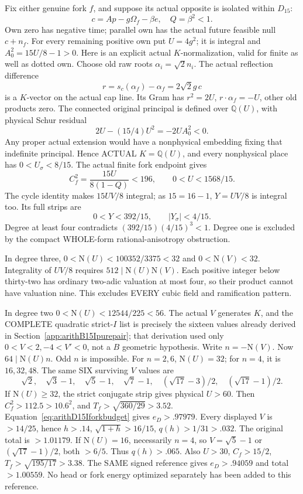 \documentclass[11pt]{article}
\begin{document}
Fix either genuine fork \(f\), and suppose its actual
opposite is isolated within \(D_{15}\):
\[
                  c=Ap-g\Omega_f-\beta e,\quad Q=\beta^2<1.
\]
Own zero has negative time; parallel own has
the actual future feasible null \(c+n_f\).
For every remaining positive own put \(U=4g^2\);
it is integral and
\(A_0^2=15U/8-1>0\).
Here is an explicit actual \(K\)-normalization,
valid for finite as well as dotted own.
Choose old raw roots \(\alpha_i=\sqrt2n_i\).
The actual reflection difference
\[
                       r=s_c(\alpha_f)-\alpha_f=2\sqrt2g\,c
\]
is a \(K\)-vector on the actual cap line.
Its Gram has
\(r^2=2U\), \(r\cdot\alpha_f=-U\), other old products zero.
The connected original principal is defined over
\(\mathbb Q(U)\), with physical Schur residual
\[
                     2U-(15/4)U^2=-2UA_0^2<0.
\]
Any proper actual extension would have a nonphysical
embedding fixing that indefinite principal.
Hence ACTUAL \(K=\mathbb Q(U)\), and every nonphysical
place has \(0<U_\sigma<8/15\).
The actual finite fork endpoint gives
\[
              C_f^2={\frac{15U}{8(1-Q)}}<196,\qquad
              0<U<1568/15 .
\]
The cycle identity makes \(15UV/8\) integral;
as \(15=16-1\), \(Y=UV/8\) is integral too.
Its full strips are
\[
                 0<Y<392/15,\qquad |Y_\sigma|<4/15.
\]
Degree at least four contradicts
\((392/15)(4/15)^3<1\).
Degree one is excluded by the compact WHOLE-form
rational-anisotropy obstruction.

In degree three,
\(0<\mathrm N(U)<100352/3375<32\) and
\(0<\mathrm N(V)<32\).
Integrality of \(UV/8\) requires
\(512\mid\mathrm N(U)\mathrm N(V)\).
Each positive integer below thirty-two has ordinary
two-adic valuation at most four, so their product
cannot have valuation nine.
This excludes EVERY cubic field and ramification pattern.

In degree two \(0<\mathrm N(U)<12544/225<56\).
The actual \(V\) generates \(K\), and the COMPLETE
quadratic strict-\(I\) list is precisely the sixteen
values already derived in
Section~\ref{app:arithB15Ipurepair};
that derivation used only \(0<V<2,-4<V'<0\),
not a \(B\) geometric hypothesis.
Write \(n=-\mathrm N(V)\).
Now \(64\mid\mathrm N(U)n\).
Odd \(n\) is impossible.
For \(n=2,6\), \(\mathrm N(U)=32\);
for \(n=4\), it is \(16,32,48\).
The same SIX surviving \(V\) values are
\[
 \sqrt2,\quad\sqrt3-1,\quad\sqrt5-1,\quad\sqrt7-1,\quad
 (\sqrt{17}-3)/2,\quad(\sqrt{17}-1)/2.
\]
If \(\mathrm N(U)\ge32\), the strict conjugate strip
gives physical \(U>60\).
Then \(C_f^2>112.5>10.6^2\), and
\(T_f>\sqrt{360/29}>3.52\).
Equation~\eqref{eq:arithD15Iforkbudget} gives
\(e_D>.97979\).
Every displayed \(V\) is \(>14/25\), hence \(h>.14\),
\(\sqrt{1+h}>16/15\), \(q(h)>1/31>.032\).
The original total is \(>1.01179\).
If \(\mathrm N(U)=16\), necessarily \(n=4\),
so \(V=\sqrt5-1\) or \((\sqrt{17}-1)/2\),
both \(>6/5\).
Thus \(q(h)>.065\).
Also \(U>30\), \(C_f>15/2\),
\(T_f>\sqrt{195/17}>3.38\).
The SAME signed reference gives \(e_D>.94059\)
and total \(>1.00559\).
No head or fork energy optimized separately has
been added to this reference.
\end{document}

